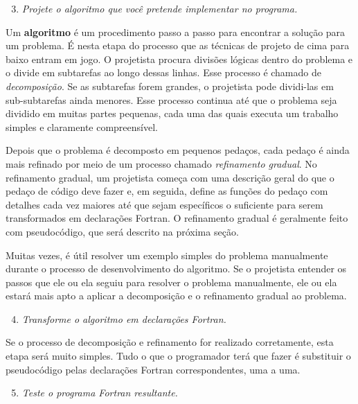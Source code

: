 \documentclass[11pt,a4paper]{book}
\begin{document}
	\begin{enumerate}
		\setcounter{enumi}{2} %
		\item \textit{Projete o algoritmo que você pretende implementar no programa.}
	\end{enumerate}
	
	Um \textbf{algoritmo} é um procedimento passo a passo para encontrar a solução para um problema. É nesta etapa do processo que as técnicas de projeto de cima para baixo entram em jogo. O projetista procura divisões lógicas dentro do problema e o divide em subtarefas ao longo dessas linhas. Esse processo é chamado de \textit{decomposição}. Se as subtarefas forem grandes, o projetista pode dividi-las em sub-subtarefas ainda menores. Esse processo continua até que o problema seja dividido em muitas partes pequenas, cada uma das quais executa um trabalho simples e claramente compreensível.
	
	Depois que o problema é decomposto em pequenos pedaços, cada pedaço é ainda mais refinado por meio de um processo chamado \textit{refinamento gradual}. No refinamento gradual, um projetista começa com uma descrição geral do que o pedaço de código deve fazer e, em seguida, define as funções do pedaço com detalhes cada vez maiores até que sejam específicos o suficiente para serem transformados em declarações Fortran. O refinamento gradual é geralmente feito com pseudocódigo, que será descrito na próxima seção.
	
	Muitas vezes, é útil resolver um exemplo simples do problema manualmente durante o processo de desenvolvimento do algoritmo. Se o projetista entender os passos que ele ou ela seguiu para resolver o problema manualmente, ele ou ela estará mais apto a aplicar a decomposição e o refinamento gradual ao problema.
	
	\begin{enumerate}
		\setcounter{enumi}{3} %
		\item \textit{Transforme o algoritmo em declarações Fortran.}
	\end{enumerate}
	
	Se o processo de decomposição e refinamento for realizado corretamente, esta etapa será muito simples. Tudo o que o programador terá que fazer é substituir o pseudocódigo pelas declarações Fortran correspondentes, uma a uma.
	
	\begin{enumerate}
		\setcounter{enumi}{4} %
		\item \textit{Teste o programa Fortran resultante.}
	\end{enumerate}
	
\end{document}
